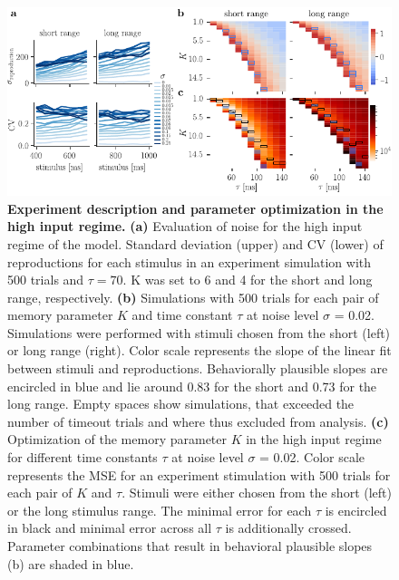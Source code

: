 \documentclass[10pt]{article}
\begin{document}
\begin{figure}[!htb]
	\centering
	\includegraphics{figures/supp_highI.pdf}
	\caption{\textbf{Experiment description and parameter optimization in the high input regime.} 
	\textbf{(a)} Evaluation of noise for the high input regime of the model. Standard deviation (upper) and CV (lower) of reproductions for each stimulus in an experiment simulation with 500 trials and $\tau = 70$. K was set to 6 and 4 for the short and long range, respectively.
	\textbf{(b)} Simulations with 500 trials for each pair of memory parameter $K$ and time constant $\tau$ at noise level $\sigma$ = 0.02. Simulations were performed with stimuli chosen from the short (left) or long range (right). Color scale represents the slope of the linear fit between stimuli and reproductions. Behaviorally plausible slopes are encircled in blue and lie around 0.83 for the short and 0.73 for the long range. Empty spaces show simulations, that exceeded the number of timeout trials and where thus excluded from analysis.
	\textbf{(c)} Optimization of the memory parameter $K$ in the high input regime for different time constants $\tau$ at noise level $\sigma$ = 0.02. Color scale represents the MSE for an experiment stimulation with 500 trials for each pair of $K$ and $\tau$. Stimuli were either chosen from the short (left) or the long stimulus range. The minimal error for each $\tau$ is encircled in black and minimal error across all $\tau$ is additionally crossed. Parameter combinations that result in behavioral plausible slopes (b) are shaded in blue. 
	}
\label{sup:highI}
\end{figure}
\end{document}

